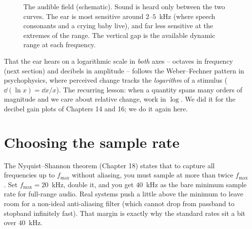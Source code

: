 \begin{figure}[H]
\centering
{}
\caption{The audible field (schematic). Sound is heard only between the two curves. The ear is
most sensitive around $2$--$5$~kHz (where speech consonants and a crying baby live), and far less
sensitive at the extremes of the range. The vertical gap is the available dynamic range at each
frequency.}
\label{ch26:fig-audiogram}
\end{figure}

\begin{connectionbox}
That the ear hears on a logarithmic scale in \emph{both} axes -- octaves in frequency (next
section) and decibels in amplitude -- follows the Weber--Fechner pattern in psychophysics, where perceived change tracks the \emph{logarithm} of a stimulus ($\dd(\ln x) = \dd x/x$).
The recurring lesson: when a quantity spans many orders of magnitude and we care about relative
change, work in $\log$. We did it for the decibel gain plots of Chapters 14 and 16; we do it again here.
\end{connectionbox}

\section{Choosing the sample rate}
\label{ch26:samplerate}

The Nyquist--Shannon theorem (Chapter 18) states that to capture all frequencies up to $f_{\max}$
without aliasing, you must sample at more than twice $f_{\max}$. Set $f_{\max} = 20$~kHz, double
it, and you get $40$~kHz as the bare minimum sample rate for full-range audio. Real systems push
a little above the minimum to leave room for a non-ideal anti-aliasing filter (which cannot drop
from passband to stopband infinitely fast). That margin is exactly why the standard rates sit a
bit over $40$~kHz.

